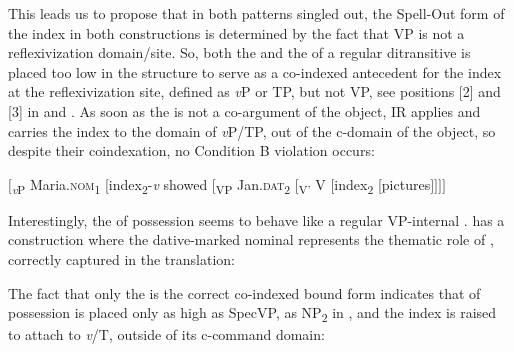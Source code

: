 \documentclass[output=paper,nonflat,colorlinks,citecolor=brown,newtxmath]{langsci/langscibook}
\begin{document}
\noindent This leads us to propose that in both patterns singled out, the Spell-Out form of the index in both constructions is determined by the fact that VP is not a reflexivization domain/site. So, both the  and the  of a regular ditransitive  is placed too low in the structure to serve as a co-indexed antecedent for the index at the reflexivization site, defined as \textit{v}P or TP, but not VP, see positions [2] and [3] in  and . As soon as the  is not a co-argument of the object, IR applies and carries the index to the domain of \textit{v}P/TP, out of the c-domain of the object, so despite their coindexation, no Condition B violation occurs:

\ea \label{ex:witkos:29}
$[$\textsubscript{\textit{v}P} Maria.\textsc{nom}\textsubscript{1} [index\textsubscript{2}-\textit{v} showed [\textsubscript{VP} Jan.\textsc{dat}\textsubscript{2} [\textsubscript{V’} V [index\textsubscript{2} [pictures$]]]]$\\
\z

\noindent Interestingly, the  of possession seems to behave like a regular VP-internal .  has a construction where the dative-marked nominal represents the thematic role of , correctly captured in the  translation:

\ea \label{ex:witkos:30}
	\z
\z

\noindent The fact that only the   is the correct co-indexed bound form indicates that  of possession is placed only as high as SpecVP, as NP\textsubscript{2} in , and the index is raised to attach to \textit{v}/T, outside of its c-command domain:
\end{document}
